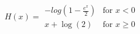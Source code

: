 

\[
H(x) = \begin{array}{ll} -log{(1 - \frac{e^{x}} {2})} & \mbox{for $x < 0$} \\ x + \log{(2)} & \mbox{for $x \ge 0$} \end{array}
\]



